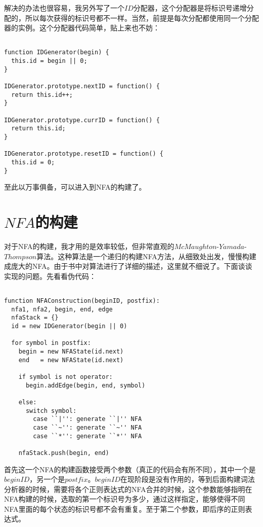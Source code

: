 解决的办法也很容易，我另外写了一个$ID$分配器，这个分配器是将标识号递增分配的，所以每次获得的标识号都不一样。当然，前提是每次分配都使用同一个分配器的实例。这个分配器代码简单，贴上来也不妨：

\begin{verbatim}

function IDGenerator(begin) {
  this.id = begin || 0;
}

IDGenerator.prototype.nextID = function() {
  return this.id++;
} 

IDGenerator.prototype.currID = function() {
  return this.id;
} 

IDGenerator.prototype.resetID = function() {
  this.id = 0;
}

\end{verbatim}

至此以万事俱备，可以进入到NFA的构建了。


\section{$NFA$的构建}

对于NFA的构建，我才用的是效率较低，但非常直观的$McMaughton$-$Yamada$-$Thompson$算法。这种算法是一个递归的构建NFA方法，从细致处出发，慢慢构建成庞大的NFA。由于书中对算法进行了详细的描述，这里就不细说了。下面谈谈实现的问题。先看看伪代码：

\begin{verbatim}

function NFAConstruction(beginID, postfix):
  nfa1, nfa2, begin, end, edge
  nfaStack = {}
  id = new IDGenerator(begin || 0)

  for symbol in postfix:
    begin = new NFAState(id.next)
    end   = new NFAState(id.next)

    if symbol is not operator:
      begin.addEdge(begin, end, symbol)

    else:
      switch symbol:
        case ``|'': generate ``|'' NFA
        case ``~'': generate ``~'' NFA
        case ``*'': generate ``*'' NFA

    nfaStack.push(begin, end)

\end{verbatim}

首先这一个NFA的构建函数接受两个参数（真正的代码会有所不同），其中一个是$beginID$，另一个是$postfix$。$beginID$在现阶段是没有作用的，等到后面构建词法分析器的时候，需要将各个正则表达式的NFA合并的时候，这个参数能够指明在NFA构建的时候，选取的第一个标识号为多少，通过这样指定，能够使得不同NFA里面的每个状态的标识号都不会有重复。至于第二个参数，即后序的正则表达式。

